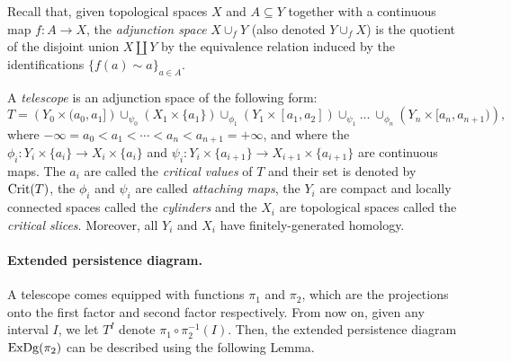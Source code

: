 
Recall that, given topological spaces $X$ and $A\subseteq Y$ together
with a continuous map $f:A\rightarrow X$, the {\em adjunction space}
$X\cup_f Y$ (also denoted $Y\cup_f X$) is the quotient of the disjoint
union $X\amalg Y$ by the equivalence relation induced by the
identifications $\{f(a)\sim a\}_{a\in A}$.


\begin{defin}\label{def:telescope}
A {\em telescope} is an adjunction space of the following form:
$$T=\left(Y_0\times (a_0,a_1]\right) \cup_{\psi_0} \left(X_1\times \{a_1\}\right) \cup_{\phi_1} \left(Y_1
\times [a_1,a_2]\right) \cup_{\psi_1} ...\ \cup_{\phi_n} \left(Y_n\times [a_n,a_{n+1})\right),$$
where $-\infty=a_0<a_1<\cdots< a_n<a_{n+1}=+\infty$,
and where the $\phi_i:Y_i\times\{a_i\}\rightarrow X_i\times\{a_i\}$
and $\psi_i:Y_i\times\{a_{i+1}\}\rightarrow X_{i+1}\times\{a_{i+1}\}$ are continuous maps. 
The $a_i$ are called the {\em critical values} of $T$ and their set is denoted by $\mathrm{Crit}(T)$,
the $\phi_i$ and $\psi_i$ are called {\em attaching maps}, 
the $Y_i$ are compact and locally connected spaces called the {\em cylinders}
and the $X_i$ are topological spaces called the {\em critical slices}.
Moreover, all $Y_i$ and $X_i$ have finitely-generated homology.
\end{defin} 

\paragraph*{Extended persistence diagram.} A telescope comes equipped with functions $\pi_1$ and $\pi_2$,
which are the projections onto the first factor and second factor respectively.
From now on, given any interval $I$, we let $T^I$ denote $\pi_1\circ\pi_2^{-1}(I)$.
Then, the extended persistence diagram $\mathrm{ExDg}(\pi_2)$ can be described using the following Lemma.




